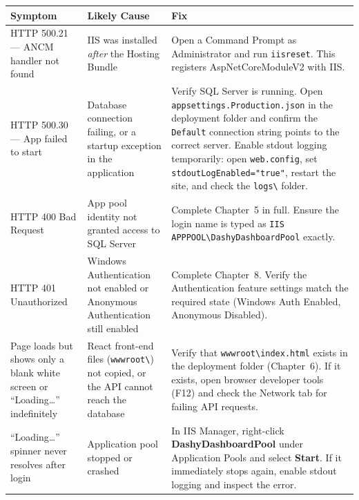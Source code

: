 \documentclass[12pt,a4paper]{report}
\begin{document}
\renewcommand{\arraystretch}{1.4}
\begin{longtable}{>{\raggedright\arraybackslash}p{4.5cm} >{\raggedright\arraybackslash}p{4.5cm} >{\raggedright\arraybackslash}p{5.5cm}}
\toprule
\textbf{Symptom} & \textbf{Likely Cause} & \textbf{Fix} \\
\midrule
\endhead

HTTP 500.21 --- ANCM handler not found &
IIS was installed \emph{after} the Hosting Bundle &
Open a Command Prompt as Administrator and run \texttt{iisreset}. This registers AspNetCoreModuleV2 with IIS. \\

\midrule

HTTP 500.30 --- App failed to start &
Database connection failing, or a startup exception in the application &
Verify SQL Server is running. Open \texttt{appsettings.Production.json} in the deployment folder and confirm the \texttt{Default} connection string points to the correct server. Enable stdout logging temporarily: open \texttt{web.config}, set \texttt{stdoutLogEnabled="true"}, restart the site, and check the \texttt{logs\textbackslash} folder. \\

\midrule

HTTP 400 Bad Request &
App pool identity not granted access to SQL Server &
Complete Chapter~5 in full. Ensure the login name is typed as \texttt{IIS APPPOOL\textbackslash DashyDashboardPool} exactly. \\

\midrule

HTTP 401 Unauthorized &
Windows Authentication not enabled or Anonymous Authentication still enabled &
Complete Chapter~8. Verify the Authentication feature settings match the required state (Windows Auth Enabled, Anonymous Disabled). \\

\midrule

Page loads but shows only a blank white screen or ``Loading\ldots'' indefinitely &
React front-end files (\texttt{wwwroot\textbackslash}) not copied, or the API cannot reach the database &
Verify that \texttt{wwwroot\textbackslash index.html} exists in the deployment folder (Chapter~6). If it exists, open browser developer tools (F12) and check the Network tab for failing API requests. \\

\midrule

``Loading\ldots'' spinner never resolves after login &
Application pool stopped or crashed &
In IIS Manager, right-click \textbf{DashyDashboardPool} under Application Pools and select \textbf{Start}. If it immediately stops again, enable stdout logging and inspect the error. \\


\end{longtable}
\end{document}
